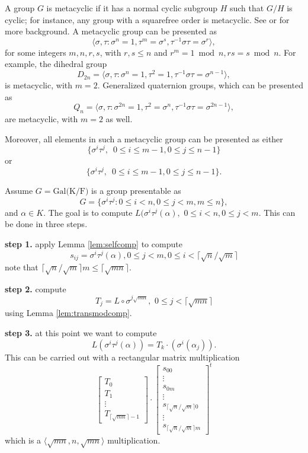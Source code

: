 A group $G$ is metacyclic if it has a normal cyclic subgroup $H$ such
that $G/H$ is cyclic; for instance, any group with a squarefree order
is metacyclic. See \cite[p.~88]{Johnson} or \cite[p.~334]{Curtis} for
more background. A metacyclic group can be presented as
\begin{equation}\label{eq:metacyclic}
  \langle \sigma,\tau: \sigma^n = 1,  \tau^m = \sigma^s, \tau^{-1}\sigma \tau = \sigma^r \rangle,
\end{equation}
for some integers $m,n,r,s$, with $r,s \leq n$ and $r^m = 1 \bmod n, rs
= s \bmod n$. For example,
the dihedral group 
$$D_{2n} = \langle \sigma,\tau: \sigma^n =1, \tau^2 = 1,  \tau^{-1} \sigma \tau = \sigma^{n-1} \rangle, $$
is metacyclic, with $m=2$. Generalized quaternion
groups, which can be presented as
$$Q_n = \langle \sigma,\tau: \sigma^{2n} =1, \tau^2 = \sigma^n, \tau^{-1} \sigma \tau = \sigma^{2n-1} \rangle,$$
are metacyclic, with $m=2$ as well.





Moreover, all elements in such a metacyclic group
can be presented as either $$\{\sigma^i \tau^j, \,\,\, 0\leq i \leq m-1, 0\leq
j \leq n-1\}$$
or $$\{\sigma^i \tau^j, \,\,\, 0\leq i \leq m-1, 0\leq
j \leq n-1\}.$$


 
Assume $G = \mathrm{Gal(K/F})$ is a group presentable as
$$G = \lbrace \sigma^i \tau^j: 0\leq i < n, 0 \leq j < m, m\leq n \rbrace,$$
and $\alpha\in K$. The goal is to compute 
$L(\sigma^i\tau^j (\alpha), \,\, 0\leq i < n, 0 \leq j <m.$
This can be done in three steps.

\textbf{step 1.} apply Lemma \ref{lem:selfcomp} to compute 
$$s_{ij} = \sigma^i\tau^j(\alpha), 0 \leq j < m, 0\leq i < \lceil \sqrt{n}/\sqrt{m} \rceil$$
note that $\lceil \sqrt{n}/\sqrt{m} \rceil m \leq \lceil \sqrt{mn} \rceil$.

\textbf{step 2.} compute $$T_j = L \circ \sigma^{j\sqrt{mn}}, \,\, 0\leq j < \lceil \sqrt{mn}\rceil$$
using Lemma	\ref{lem:transmodcomp}.

\textbf{step 3.} at this point we want to compute 
$$L(\sigma^i\tau^j(\alpha)) = T_k\cdot(\sigma^i(\alpha_j)).$$
This can be carried out with a rectangular matrix multiplication
$$
\left[ \begin{array}{c}
T_0\\
\hline
T_1\\
\hline
\vdots\\
\hline
T_{\lceil \sqrt{mn} \rceil-1}
\end{array} 
\right]
\cdot
\left[\begin{array}{l}
s_{00} \\
\hline
 \vdots \\
 \hline
s_{0m} \\
 \hline
\vdots \\
\hline
s_{\lceil \sqrt{n}/\sqrt{m} \rceil 0} \\
\hline
\vdots \\
\hline
s_{\lceil \sqrt{n}/\sqrt{m} \rceil m}
\end{array}
\right]^t
$$
which is a $\langle \sqrt{mn},n,\sqrt{mn}\rangle$ multiplication. 

